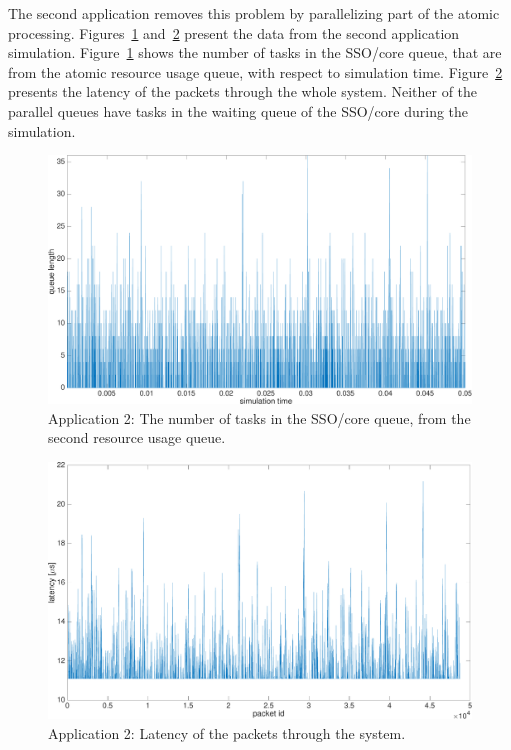 The second application removes this problem by parallelizing part of the atomic processing. Figures~\ref{fig:app2-queue2} and~\ref{fig:app2-latency} present the data from the second application simulation. Figure~\ref{fig:app2-queue2} shows the number of tasks in the SSO/core queue, that are from the atomic resource usage queue, with respect to simulation time. Figure~\ref{fig:app2-latency} presents the latency of the packets through the whole system. Neither of the parallel queues have tasks in the waiting queue of the SSO/core during the simulation.

\begin{figure}[]
  \begin{center}
    \includegraphics[width=\textwidth]{images/experiment/app2-queue2.pdf}
    \caption{Application 2: The number of tasks in the SSO/core queue, from the second resource usage queue.}
    \label{fig:app2-queue2}
  \end{center}
\end{figure}

\begin{figure}[]
  \begin{center}
    \includegraphics[width=\textwidth]{images/experiment/app2-latency.pdf}
    \caption{Application 2: Latency of the packets through the system.}
    \label{fig:app2-latency}
  \end{center}
\end{figure}

